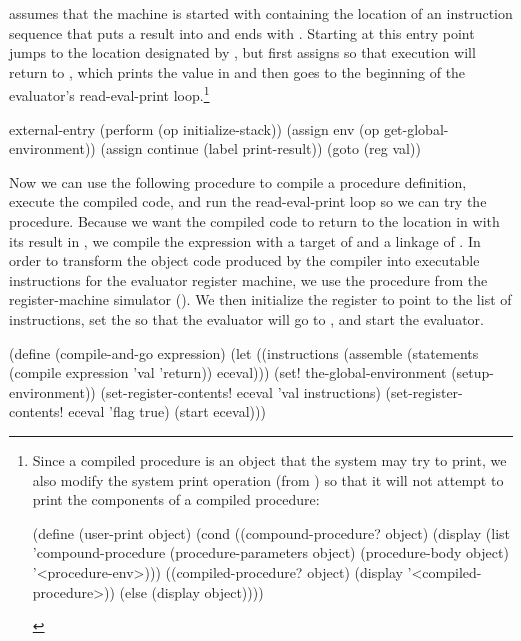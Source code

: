 \noindent
{} assumes that the machine is started with 
containing the location of an instruction sequence that puts a result into
 and ends with .  Starting at this entry
point jumps to the location designated by , but first assigns
 so that execution will return to , which
prints the value in  and then goes to the beginning of the
evaluator's read-eval-print loop.\footnote{Since a compiled procedure is an
object that the system may try to print, we also modify the system print
operation  (from ) so that it will not
attempt to print the components of a compiled procedure:

\begin{compactCodeBlock}
(define (user-print object)
  (cond ((compound-procedure? object)
         (display (list 'compound-procedure
                        (procedure-parameters object)
                        (procedure-body object)
                        '<procedure-env>)))
        ((compiled-procedure? object)
         (display '<compiled-procedure>))
        (else (display object))))
\end{compactCodeBlock}
}

\begin{codeBlock}
external-entry
  (perform (op initialize-stack))
  (assign env (op get-global-environment))
  (assign continue (label print-result))
  (goto (reg val))
\end{codeBlock}

\noindent
Now we can use the following procedure to compile a procedure definition,
execute the compiled code, and run the read-eval-print loop so we can try the
procedure.  Because we want the compiled code to return to the location in
 with its result in , we compile the expression with a
target of  and a linkage of .  In order to transform the
object code produced by the compiler into executable instructions for the
evaluator register machine, we use the procedure  from the
register-machine simulator ().  We then initialize the
 register to point to the list of instructions, set the 
so that the evaluator will go to , and start the
evaluator.

\begin{codeBlock}
(define (compile-and-go expression)
  (let ((instructions
         (assemble
          (statements
           (compile expression 'val 'return))
          eceval)))
    (set! the-global-environment (setup-environment))
    (set-register-contents! eceval 'val instructions)
    (set-register-contents! eceval 'flag true)
    (start eceval)))
\end{codeBlock}

